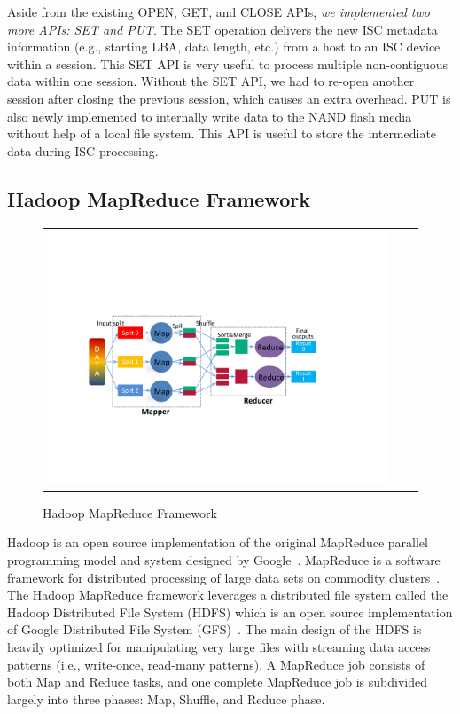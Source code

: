 Aside from the existing OPEN, GET, and CLOSE APIs, \emph{we implemented two more APIs: SET and PUT}. The SET operation delivers the new ISC metadata information (e.g., starting LBA, data length, etc.) from a host to an ISC device within a session. This SET API is very useful to process multiple non-contiguous data within one session. Without the SET API, we had to re-open another session after closing the previous session, which causes an extra overhead. PUT is also newly implemented to internally write data to the NAND flash media without help of a local file system. This API is useful to store the intermediate data during ISC processing.


\subsection{Hadoop MapReduce Framework}\label{sec:searchEngineArch}

\begin{figure}[htbp]
  \centering
  \begin{tabular}{ccc}
 \includegraphics[width=0.99\columnwidth]{figures/HadoopMR.pdf}
\end{tabular}
  \caption{Hadoop MapReduce Framework}
  \label{fig:HadoopMR}
 \end{figure}



Hadoop is an open source implementation of the original MapReduce parallel programming model and system designed by Google~\cite{MapReduce:OSDI:2004}. MapReduce is a software framework for distributed processing of large data sets on commodity clusters~\cite{HadoopMapReduce:ACM:2010}. The Hadoop MapReduce framework leverages a distributed file system called the Hadoop Distributed File System (HDFS) which is an open source implementation of Google Distributed File System (GFS)~\cite{GFS:SOSP:2003}. The main design of the HDFS is heavily optimized for manipulating very large files with streaming data access patterns (i.e., write-once, read-many patterns). A MapReduce job consists of both Map and Reduce tasks, and one complete MapReduce job is subdivided largely into three phases: Map, Shuffle, and Reduce phase.

